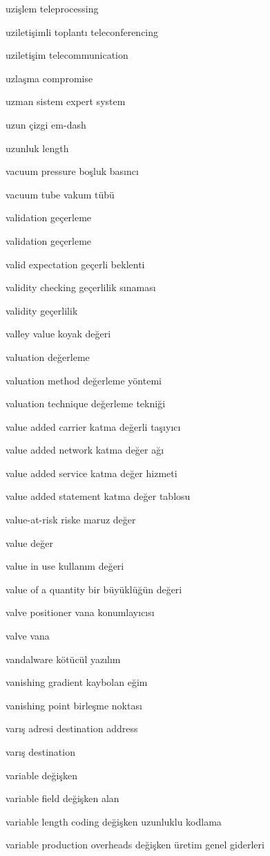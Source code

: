 \documentclass[12pt,fleqn]{article}\usepackage{../../common}
\begin{document}
uzişlem teleprocessing

uziletişimli toplantı teleconferencing

uziletişim telecommunication

uzlaşma compromise

uzman sistem expert system

uzun çizgi em-dash

uzunluk length

vacuum pressure boşluk basıncı

vacuum tube vakum tübü

validation geçerleme

validation geçerleme

valid expectation geçerli beklenti

validity checking geçerlilik sınaması

validity geçerlilik

valley value koyak değeri

valuation değerleme

valuation method değerleme yöntemi

valuation technique değerleme tekniği

value added carrier katma değerli taşıyıcı

value added network katma değer ağı

value added service katma değer hizmeti

value added statement katma değer tablosu

value-at-risk riske maruz değer

value değer

value in use kullanım değeri

value of a quantity bir büyüklüğün değeri

valve positioner vana konumlayıcısı

valve vana

vandalware kötücül yazılım

vanishing gradient kaybolan eğim

vanishing point birleşme noktası

varış adresi destination address

varış destination

variable değişken

variable field değişken alan

variable length coding değişken uzunluklu kodlama

variable production overheads değişken üretim genel giderleri
\end{document}
